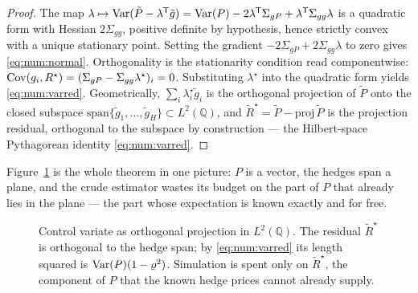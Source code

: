 \begin{proof}
The map $\lambda \mapsto \operatorname{Var}(\tilde P - \lambda^{\mathsf T}\tilde g) =
\operatorname{Var}(P) - 2\lambda^{\mathsf T}\Sigma_{gP} + \lambda^{\mathsf T}\Sigma_{gg}\lambda$
is a quadratic form with Hessian $2\Sigma_{gg}$, positive definite by
hypothesis, hence strictly convex with a unique stationary point. Setting the
gradient $-2\Sigma_{gP} + 2\Sigma_{gg}\lambda$ to zero gives
\eqref{eq:num:normal}. Orthogonality is the stationarity condition read
componentwise: $\operatorname{Cov}(g_i, R^\star) = (\Sigma_{gP} - \Sigma_{gg}\lambda^\star)_i =
0$. Substituting $\lambda^\star$ into the quadratic form yields
\eqref{eq:num:varred}. Geometrically, $\sum_i \lambda^\star_i \tilde g_i$ is the
orthogonal projection of $\tilde P$ onto the closed subspace
$\mathrm{span}\{\tilde g_1,\dots,\tilde g_H\} \subset L^2(\mathbb{Q})$,
and $\tilde R^\star = \tilde P - \mathrm{proj}\,\tilde P$ is the projection
residual, orthogonal to the subspace by construction --- the Hilbert-space
Pythagorean identity \eqref{eq:num:varred}.
\end{proof}

Figure~\ref{fig:num:projection} is the whole theorem in one picture: $P$ is a
vector, the hedges span a plane, and the crude estimator wastes its budget on
the part of $P$ that already lies in the plane --- the part whose expectation is
known exactly and for free.

\begin{figure}[t]
\centering
{}
\caption{Control variate as orthogonal projection in $L^2(\mathbb{Q})$.
The residual $\tilde R^\star$ is orthogonal to the hedge span; by
\eqref{eq:num:varred} its length squared is $\operatorname{Var}(P)(1-\varrho^2)$. Simulation
is spent only on $\tilde R^\star$, the component of $P$ that the known hedge
prices cannot already supply.}
\label{fig:num:projection}
\end{figure}

